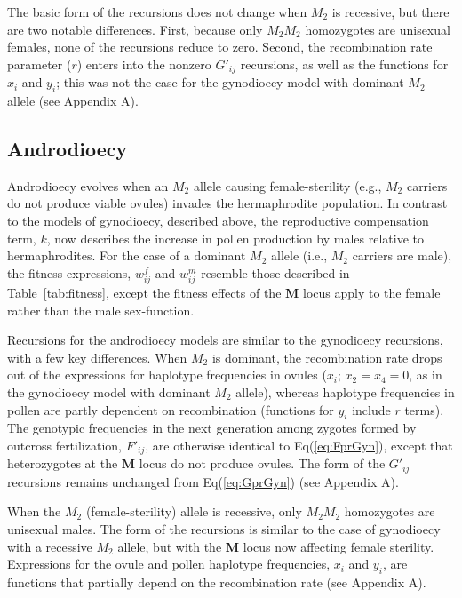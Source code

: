 \documentclass{article}
\begin{document}
The basic form of the recursions does not change when $M_2$ is recessive, but there are two notable differences. First, because only $M_2M_2$ homozygotes are unisexual females, none of the recursions reduce to zero. Second, the recombination rate parameter ($r$) enters into the nonzero $G'_{ij}$ recursions, as well as the functions for $x_i$ and $y_i$; this was not the case for the gynodioecy model with dominant $M_2$ allele (see Appendix A).


\subsection*{Androdioecy}

Androdioecy evolves when an $M_2$ allele causing female-sterility (e.g., $M_2$ carriers do not produce viable ovules) invades the hermaphrodite population. In contrast to the models of gynodioecy, described above, the reproductive compensation term, $k$, now describes the increase in pollen production by males relative to hermaphrodites. For the case of a dominant $M_2$ allele (i.e., $M_2$ carriers are male), the fitness expressions, $w^f_{ij}$ and $w^m_{ij}$ resemble those described in Table~\ref{tab:fitness}, except the fitness effects of the $\mathbf{M}$ locus apply to the female rather than the male sex-function. 

Recursions for the androdioecy models are similar to the gynodioecy recursions, with a few key differences. When $M_2$ is dominant, the recombination rate drops out of the expressions for haplotype frequencies in ovules ($x_i$; $x_2=x_4=0$, as in the gynodioecy model with dominant $M_2$ allele), whereas haplotype frequencies in pollen are partly dependent on recombination (functions for $y_i$ include $r$ terms). The genotypic frequencies in the next generation among zygotes formed by outcross fertilization, $F'_{ij}$, are otherwise identical to Eq(\ref{eq:FprGyn}), except that heterozygotes at the $\mathbf{M}$ locus do not produce ovules. The form of the $G'_{ij}$ recursions remains unchanged from Eq(\ref{eq:GprGyn}) (see Appendix A).

When the $M_2$ (female-sterility) allele is recessive, only $M_2M_2$ homozygotes are unisexual males. The form of the recursions is similar to the case of gynodioecy with a recessive $M_2$ allele, but with the $\mathbf{M}$ locus now affecting female sterility. Expressions for the ovule and pollen haplotype frequencies, $x_i$ and $y_i$, are functions that partially depend on the recombination rate (see Appendix A).
\end{document}
